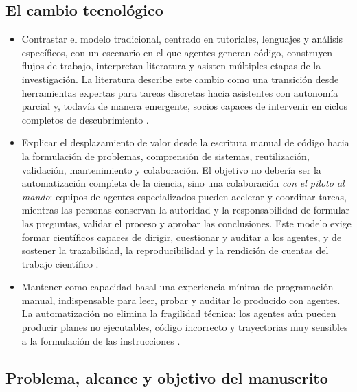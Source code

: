 \documentclass[11pt,a4paper]{article}
\begin{document}
\subsection{El cambio tecnológico}

\begin{itemize}
  \item Contrastar el modelo tradicional, centrado en tutoriales, lenguajes y
  análisis específicos, con un escenario en el que agentes generan código,
  construyen flujos de trabajo, interpretan literatura y asisten múltiples etapas
  de la investigación. La literatura describe este cambio como una transición
  desde herramientas expertas para tareas discretas hacia asistentes con autonomía
  parcial y, todavía de manera emergente, socios capaces de intervenir en ciclos
  completos de descubrimiento \citep{wei2025agentic}.
  \item Explicar el desplazamiento de valor desde la escritura manual de código
  hacia la formulación de problemas, comprensión de sistemas, reutilización,
  validación, mantenimiento y colaboración. El objetivo no debería ser la
  automatización completa de la ciencia, sino una colaboración
  \emph{con el piloto al mando}: equipos de agentes especializados pueden
  acelerar y coordinar tareas, mientras las personas conservan la autoridad y la
  responsabilidad de formular las preguntas, validar el proceso y aprobar las
  conclusiones. Este modelo exige formar científicos capaces de dirigir,
  cuestionar y auditar a los agentes, y de sostener la trazabilidad, la
  reproducibilidad y la rendición de cuentas del trabajo científico
  \citep{wang2026five}.
  \item Mantener como capacidad basal una experiencia mínima de programación
  manual, indispensable para leer, probar y auditar lo producido con agentes. La
  automatización no elimina la fragilidad técnica: los agentes aún pueden producir
  planes no ejecutables, código incorrecto y trayectorias muy sensibles a la
  formulación de las instrucciones \citep{wei2025agentic}.
\end{itemize}

\subsection{Problema, alcance y objetivo del manuscrito}
\end{document}
